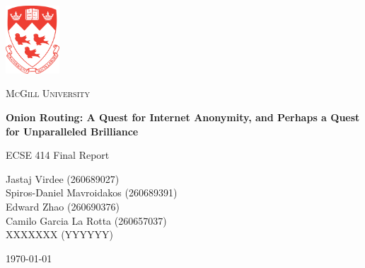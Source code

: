 \documentclass[10pt]{report}
\begin{document}
\begin{titlepage}
    \begin{center}
        \includegraphics[width=0.15\textwidth]{images/McGill.pdf}~\par\vspace{1cm}
        {\scshape\LARGE McGill University \par}
        \vspace{1cm}
        {\huge\bfseries Onion Routing: A Quest for Internet Anonymity, and Perhaps a Quest for Unparalleled Brilliance\par}
        \vspace{1.5cm}
        {\Large ECSE 414 Final Report\par}
        \vspace{2cm}
        {\Large Jastaj Virdee (260689027) \\}
        {\Large Spiros-Daniel Mavroidakos (260689391) \\}
        {\Large Edward Zhao (260690376) \\}
        {\Large Camilo Garcia La Rotta (260657037) \\}
        {\Large XXXXXXX (YYYYYY) \\}
        \vfill
        {\large \today\par}
    \end{center}
\end{titlepage}

\tableofcontents
\doublespacing
\end{document}
